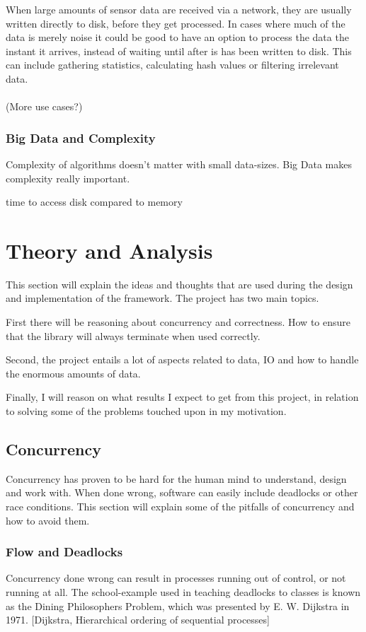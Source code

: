 \documentclass[a4paper]{article}
\begin{document}
When large amounts of sensor data are received via a network, they are usually written directly to disk, before
they get processed. In cases where much of the data is merely noise it could be good to have an option to process
the data the instant it arrives, instead of waiting until after is has been written to disk. This can include
gathering statistics, calculating hash values or filtering irrelevant data.\\\\

(More use cases?)



\subsubsection{Big Data and Complexity}
Complexity of algorithms doesn't matter with small data-sizes. Big Data makes complexity really important.

time to access disk compared to memory





\newpage
\section{Theory and Analysis}
This section will explain the ideas and thoughts that are used during the design and implementation of the framework.
The project has two main topics.

First there will be reasoning about concurrency and correctness. How to ensure that the
library will always terminate when used correctly.

Second, the project entails a lot of aspects related to data, IO and
how to handle the enormous amounts of data.

Finally, I will reason on what results I expect to get from this project, in relation to solving some of the problems touched upon in my motivation.



\subsection{Concurrency}
Concurrency has proven to be hard for the human mind to understand, design and work with. When done wrong, software can easily
include deadlocks or other race conditions. This section will explain some of the pitfalls of concurrency and how to avoid them.


\subsubsection{Flow and Deadlocks}
Concurrency done wrong can result in processes running out of control, or not running at all. The school-example used in teaching deadlocks to classes is known as the Dining Philosophers Problem, which was presented by E. W. Dijkstra in 1971. [Dijkstra, Hierarchical ordering of sequential processes]
\end{document}
